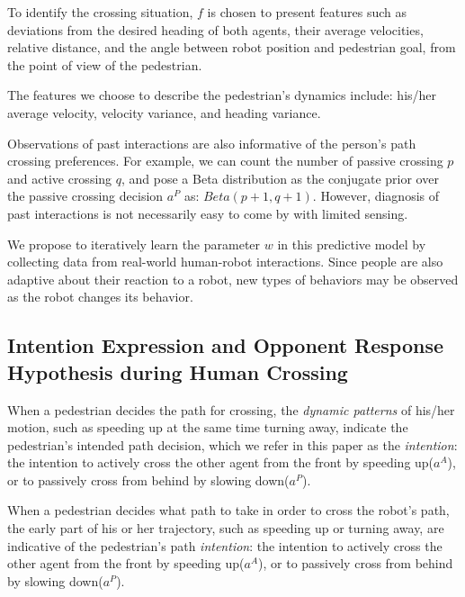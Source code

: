 \documentclass[conference]{IEEEtran}
\begin{document}
To identify the crossing situation, $f$ is chosen to 
present features such as deviations from the desired heading of 
both agents, their average velocities, relative distance, and the angle between 
robot position and pedestrian goal, from the point of view of the pedestrian.

The features we choose to describe the pedestrian's dynamics include: his/her 
average velocity, velocity variance, and heading variance.

Observations of past interactions are also informative of the person's
path crossing preferences. For example, we can count the number of
passive crossing $p$ and active crossing $q$, and pose a Beta
distribution as the conjugate prior over the passive crossing decision $a^P$ as:
$Beta(p+1, q+1)$.
However, diagnosis of past interactions is
not necessarily easy to come by with limited sensing.

We propose to iteratively learn the parameter $w$ in this predictive model
by collecting data from real-world human-robot interactions. Since people are also adaptive about their reaction to a robot, 
new types of behaviors may be observed as the robot changes its behavior.

\vspace{-.2em}
\subsection{Intention Expression and Opponent Response Hypothesis during Human Crossing}
When a pedestrian decides the path for crossing, the \textit{dynamic patterns} of his/her
motion, such as speeding up at the same time turning away, indicate the pedestrian's
intended path decision, which we refer in this paper as the \textit{intention}: the 
intention to actively cross the other agent from the front by speeding up($a^A$), 
or to passively cross from behind by slowing down($a^P$).

When a pedestrian decides what path to take in
order to cross the robot's path, the early part of his or her trajectory, such as speeding up or turning away, are indicative of the pedestrian's path \textit{intention}:  the 
intention to actively cross the other agent from the front by speeding up($a^A$), 
or to passively cross from behind by slowing down($a^P$).
\end{document}
